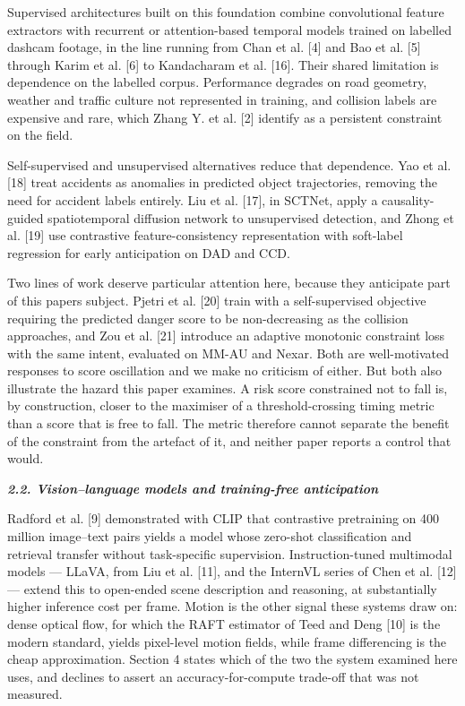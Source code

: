 Supervised architectures built on this foundation combine convolutional feature extractors with recurrent or attention-based temporal models trained on labelled dashcam footage, in the line running from Chan et al. {[}4{]} and Bao et al. {[}5{]} through Karim et al. {[}6{]} to Kandacharam et al. {[}16{]}. Their shared limitation is dependence on the labelled corpus. Performance degrades on road geometry, weather and traffic culture not represented in training, and collision labels are expensive and rare, which Zhang Y. et al. {[}2{]} identify as a persistent constraint on the field.

Self-supervised and unsupervised alternatives reduce that dependence. Yao et al. {[}18{]} treat accidents as anomalies in predicted object trajectories, removing the need for accident labels entirely. Liu et al. {[}17{]}, in SCTNet, apply a causality-guided spatiotemporal diffusion network to unsupervised detection, and Zhong et al. {[}19{]} use contrastive feature-consistency representation with soft-label regression for early anticipation on DAD and CCD.

Two lines of work deserve particular attention here, because they anticipate part of this paper\textquotesingle s subject. Pjetri et al. {[}20{]} train with a self-supervised objective requiring the predicted danger score to be non-decreasing as the collision approaches, and Zou et al. {[}21{]} introduce an adaptive monotonic constraint loss with the same intent, evaluated on MM-AU and Nexar. Both are well-motivated responses to score oscillation and we make no criticism of either. But both also illustrate the hazard this paper examines. A risk score constrained not to fall is, by construction, closer to the maximiser of a threshold-crossing timing metric than a score that is free to fall. The metric therefore cannot separate the benefit of the constraint from the artefact of it, and neither paper reports a control that would.

\emph{\textbf{2.2. Vision--language models and training-free anticipation}}

Radford et al. {[}9{]} demonstrated with CLIP that contrastive pretraining on 400 million image--text pairs yields a model whose zero-shot classification and retrieval transfer without task-specific supervision. Instruction-tuned multimodal models --- LLaVA, from Liu et al. {[}11{]}, and the InternVL series of Chen et al. {[}12{]} --- extend this to open-ended scene description and reasoning, at substantially higher inference cost per frame. Motion is the other signal these systems draw on: dense optical flow, for which the RAFT estimator of Teed and Deng {[}10{]} is the modern standard, yields pixel-level motion fields, while frame differencing is the cheap approximation. Section 4 states which of the two the system examined here uses, and declines to assert an accuracy-for-compute trade-off that was not measured.

